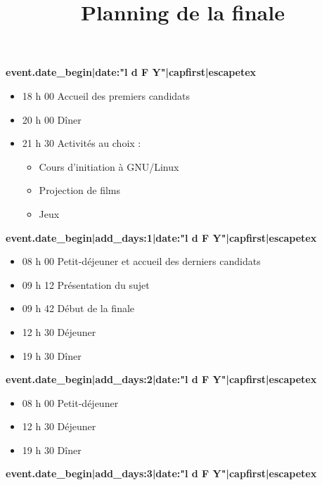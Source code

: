 \documentclass[a4paper,11pt]{prologin}
\title{Planning de la finale}
\begin{document}
\textbf{ {{ event.date_begin|date:"l d F Y"|capfirst|escapetex }} }

    \begin{itemize}
        \item 18 h 00                 Accueil des premiers candidats
        \item 20 h 00                 Dîner
        \item 21 h 30                 Activités au choix :
	    \begin{itemize}
		\item[~]            Cours d'initiation à GNU/Linux
		\item[~]            Projection de films
		\item[~]            Jeux
	    \end{itemize}
    \end{itemize}

\vspace{0.3cm}
\textbf{ {{ event.date_begin|add_days:1|date:"l d F Y"|capfirst|escapetex }} }

    \begin{itemize}
        \item 08 h 00                 Petit-déjeuner et accueil des derniers candidats
        \item 09 h 12                 Présentation du sujet
        \item 09 h 42                 Début de la finale
        \item 12 h 30                 Déjeuner
        \item 19 h 30                 Dîner
    \end{itemize}

\vspace{0.3cm}
\textbf{ {{ event.date_begin|add_days:2|date:"l d F Y"|capfirst|escapetex }} }

    \begin{itemize}
        \item 08 h 00                 Petit-déjeuner
        \item 12 h 30                 Déjeuner
        \item 19 h 30                 Dîner
    \end{itemize}

\vspace{0.3cm}
\textbf{ {{ event.date_begin|add_days:3|date:"l d F Y"|capfirst|escapetex }} }
\end{document}
